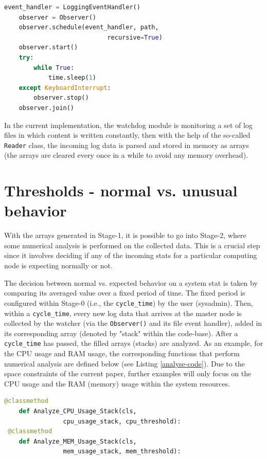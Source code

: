 \documentclass[conference]{IEEEtran}
\begin{document}
\begin{lstlisting}[language=Python, caption=A straightforward example of using the watchdog module to track a file for any changes.,basicstyle=\footnotesize,label={watchdog-code}]
 event_handler = LoggingEventHandler()
    observer = Observer()
    observer.schedule(event_handler, path, 
                            recursive=True)
    observer.start()
    try:
        while True:
            time.sleep(1)
    except KeyboardInterrupt:
        observer.stop()
    observer.join()
\end{lstlisting}

In the current implementation, the watchdog module is monitoring a set of log files in which content is written constantly, then with the help of the so-called \texttt{Reader} class, the incoming log data is parsed and stored in memory as arrays (the arrays are cleared every once in a while to avoid any memory overhead).

\section{Thresholds - normal vs. unusual behavior}
\label{section-thresholds}

With the arrays generated in Stage-1, it is possible to go into Stage-2, where some numerical analysis is performed on the collected data. This is a crucial step since it involves deciding if any of the incoming stats for a particular computing node is expecting normally or not.
\par The decision between normal vs. expected behavior on a system stat is taken by comparing its averaged value over a fixed period of time. The fixed period is configured within Stage-0 (i.e., the \texttt{cycle\_time}) by the user (sysadmin). Then, within a \texttt{cycle\_time}, every new log data that arrives at the master node is collected by the watcher (via the \texttt{Observer()} and its file event handler), added in its corresponding array (denoted by "stack" within the code-base). After a \texttt{cycle\_time} has passed, the filled arrays (stacks) are analyzed. As an example, for the CPU usage and RAM usage, the corresponding functions that perform numerical analysis are defined below (see Listing \ref{analyse-code}). Due to the space constraints of the current paper, further examples will only focus on the CPU usage and the RAM (memory) usage within the system resources.

\begin{lstlisting}[language=Python, caption=The methods for calculating averaged stats values used within the project code-base.,basicstyle=\footnotesize,label={analyse-code}]
@classmethod
    def Analyze_CPU_Usage_Stack(cls, 
                cpu_usage_stack, cpu_threshold):
 @classmethod
    def Analyze_MEM_Usage_Stack(cls,
                mem_usage_stack, mem_threshold):
\end{lstlisting}
\end{document}
